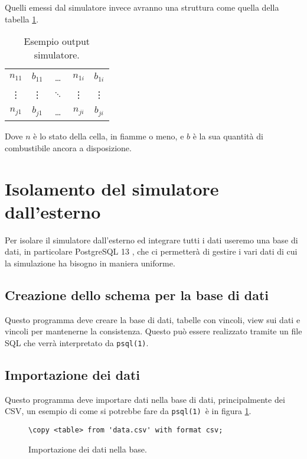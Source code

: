 \documentclass[draft]{article}
\newcommand{\eng}[1]{\foreignlanguage{english}{#1}} %
\newcommand{\psql}{\texttt{psql(1)}}
\begin{document}
Quelli emessi dal simulatore invece avranno una struttura come quella della
tabella \ref{tab:output}.

\begin{table}
\centering
\begin{tabular}{|c|c|c|c|c|}
	\hline
	$n_{11}$ & $b_{11}$ & \dots & $n_{1i}$ & $b_{1i}$\\
	\vdots & \vdots & $\ddots$ & \vdots & \vdots\\
	$n_{j1}$ & $b_{j1}$ & \dots & $n_{ji}$ & $b_{ji}$\\
	\hline
\end{tabular}
\caption{Esempio \eng{output} simulatore.}
\label{tab:output}
\end{table}

Dove $n$ è lo stato della cella, in fiamme o meno, e $b$ è la sua quantità di
combustibile ancora a disposizione.
\fi

\section{Isolamento del simulatore dall'esterno}

Per isolare il simulatore dall'esterno ed integrare tutti i dati useremo una
base di dati, in particolare PostgreSQL 13 \cite{psql}, che ci permetterà di
gestire i vari dati di cui la simulazione ha bisogno in maniera uniforme.

\subsection{Creazione dello schema per la base di dati}

Questo programma deve creare la base di dati, tabelle con vincoli, \eng{view}
sui dati e vincoli per mantenerne la consistenza. Questo può essere realizzato
tramite un file SQL che verrà interpretato da \psql.

\subsection{Importazione dei dati}
\label{sec:import}

Questo programma deve importare dati nella base di dati, principalmente dei CSV,
un esempio di come si potrebbe fare da \psql\ è in figura \ref{fig:import}.

\begin{figure}
\centering\verb+\copy <table> from 'data.csv' with format csv;+
\caption{Importazione dei dati nella base.}
\label{fig:import}
\end{figure}
\end{document}
